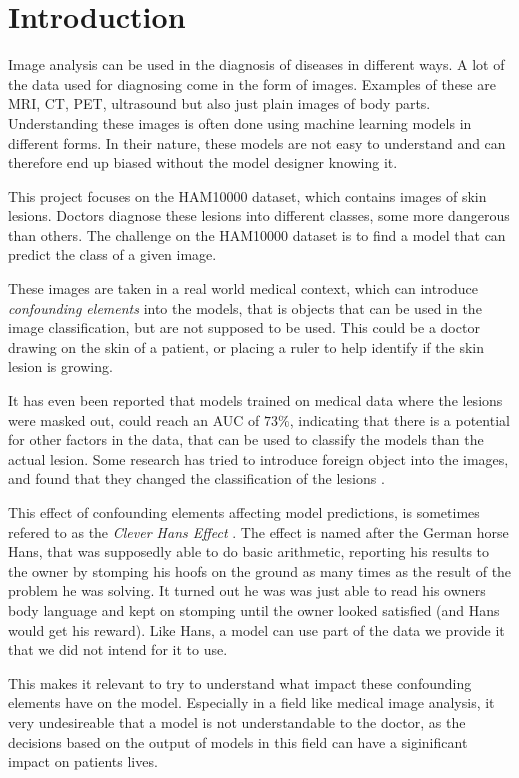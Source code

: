 \chapter{Introduction}\label{sec:introduction}
Image analysis can be used in the diagnosis of diseases in different ways.
A lot of the data used for diagnosing come in the form of images.
Examples of these are MRI, CT, PET, ultrasound but also just plain images of body parts.
Understanding these images is often done using machine learning models in different forms.
In their nature, these models are not easy to understand and can therefore end up biased without
the model designer knowing it.

This project focuses on the HAM10000 dataset\cite{Tschandl_2018}, which contains images of skin lesions.
Doctors diagnose these lesions into different classes, some more dangerous than others.
The challenge on the HAM10000 dataset is to find a model that can predict the class of a given image.

These images are taken in a real world medical context,
which can introduce \textit{confounding elements} into the models,
that is objects that can be used in the image classification,
but are not supposed to be used.
This could be a doctor drawing on the skin of a patient,
or placing a ruler to help identify if the skin lesion is growing.

It has even been reported that models trained on medical data where the lesions were masked out,
could reach an AUC of $73\%$\cite{DeConstructing_Bias_on_Skin_Lesion_Datasets_2019},
indicating that there is a potential for other factors in the data,
that can be used to classify the models than the actual lesion.
Some research has tried to introduce foreign object into the images,
and found that they changed the classification of the lesions \cite{Towards_Explainable_Classifiers_Using_the_Counterfactual_Approach_2019}.

This effect of confounding elements affecting model predictions, 
is sometimes refered to as the \textit{Clever Hans Effect} .
The effect is named after the German horse Hans,
that was supposedly able to do basic arithmetic,
reporting his results to the owner by stomping his hoofs on the ground as many times as the result of the problem he was solving.
It turned out he was was just able to read his owners body language and kept on stomping until the owner looked satisfied (and Hans would get his reward).
Like Hans, a model can use part of the data we provide it that we did not intend for it to use.

This makes it relevant to try to understand what impact these confounding elements have on the model.
Especially in a field like medical image analysis,
it very undesireable that a model is not understandable to the doctor,
as the decisions based on the output of models in this field can have a siginificant impact on patients lives.